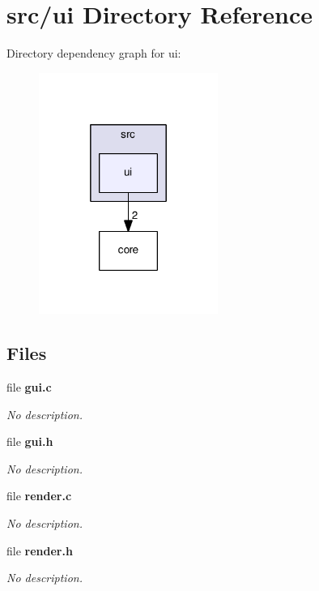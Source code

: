\section{src/ui Directory Reference}
\label{dir_da5c6b39c0a2f54e57df6799511cd3ab}
Directory dependency graph for ui\+:
\nopagebreak
\begin{figure}[H]
\begin{center}
\leavevmode
\includegraphics[width=166pt]{dir_da5c6b39c0a2f54e57df6799511cd3ab_dep}
\end{center}
\end{figure}
\subsection*{Files}
\begin{DoxyCompactItemize}
\item 
file \textbf{ gui.\+c}
\begin{DoxyCompactList}\small\item\em No description. \end{DoxyCompactList}\item 
file \textbf{ gui.\+h}
\begin{DoxyCompactList}\small\item\em No description. \end{DoxyCompactList}\item 
file \textbf{ render.\+c}
\begin{DoxyCompactList}\small\item\em No description. \end{DoxyCompactList}\item 
file \textbf{ render.\+h}
\begin{DoxyCompactList}\small\item\em No description. \end{DoxyCompactList}\end{DoxyCompactItemize}
